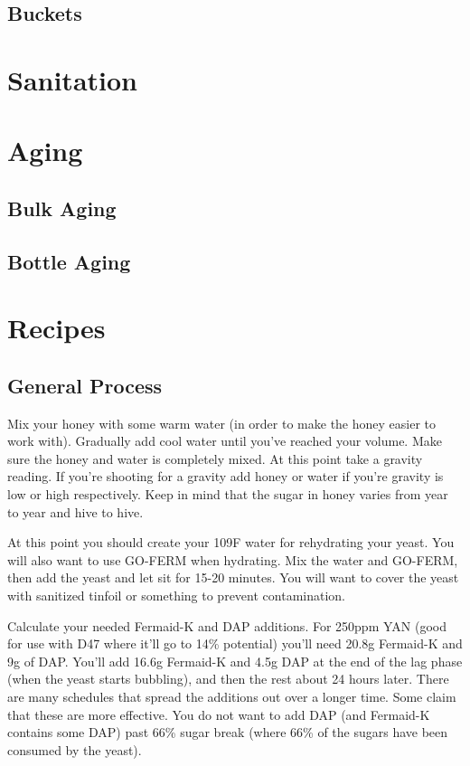 \documentclass{article}
\begin{document}
{ \subsection{Buckets}

\section{Sanitation}

\section{Aging}
 \subsection{Bulk Aging}
 \subsection{Bottle Aging}



\section{Recipes}
 \subsection{General Process}
  Mix your honey with some warm water (in order to make the honey easier to work with). Gradually add cool water 
  until you've reached your volume. Make sure the honey and water is completely mixed. At this point take a 
  gravity reading. If you're shooting for a gravity add honey or water if you're gravity is low or high 
  respectively. Keep in mind that the sugar in honey varies from year to year and hive to hive.

  At this point you should create your 109\textdegree F water for rehydrating your yeast. You will also want to 
  use GO-FERM when hydrating. Mix the water and GO-FERM, then add the yeast and let sit for 15-20 minutes. 
  You will want to cover the yeast with sanitized tinfoil or something to prevent contamination.

  Calculate your needed Fermaid-K and DAP additions. For 250ppm YAN (good for use with D47 where it'll go 
  to 14\% potential) you'll need 20.8g Fermaid-K and 9g of DAP.
  You'll add 16.6g Fermaid-K and 4.5g DAP at the end of the lag phase (when the yeast starts bubbling), and 
  then the rest about 24 hours later. 
  There are many schedules that spread the additions out over a longer time. 
  Some claim that these are more effective. 
  You do not want to add DAP (and Fermaid-K contains some DAP) past 66\% sugar break (where 66\% of the sugars 
  have been consumed by the yeast).

}
\end{document}
